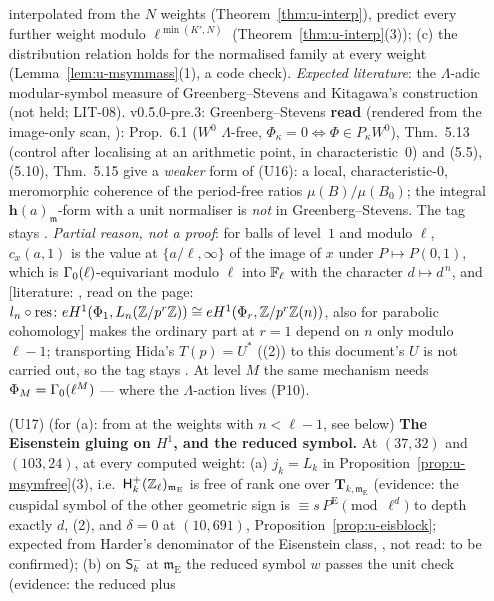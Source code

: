 \documentclass[11pt]{article}
\newcommand{\LIT}[1]{\textsf{[literature: #1]}}   %
\newcommand{\Iw}{\Lambda}                         %
\newcommand{\hcusp}{\mathbf{h}}                   %
\newcommand{\Tu}{\mathbf{T}}                      %
\newcommand{\Eis}{\mathrm{E}}
\newcommand{\Zl}{\Z_\ell}
\begin{document}
\begin{prediction}[(U15)--(U17): $\Iw$-adic modular symbols at the slot-21 cells]
\begin{enumerate}
  interpolated from the $N$ weights (Theorem~\ref{thm:u-interp}), predict every further weight modulo $\ell^{\min(K',N)}$ (Theorem~\ref{thm:u-interp}(3)); (c) the distribution relation holds for
  the normalised family at every weight (Lemma~\ref{lem:u-msymmass}(1), a code check). \emph{Expected literature}: the $\Iw$-adic modular-symbol measure of Greenberg--Stevens
  \cite{greenberg_stevens} and Kitagawa's construction (not held;  LIT-08). v0.5.0-pre.3: Greenberg--Stevens \textbf{read}
  (rendered from the image-only scan, ): Prop.~6.1 ($W^{0}$ $\Lambda$-free, $\Phi_\kappa=0\iff\Phi\in P_\kappa W^{0}$), Thm.~5.13 (control after
  localising at an arithmetic point, in characteristic~$0$) and (5.5), (5.10), Thm.~5.15 give a \emph{weaker} form of (U16): a local, characteristic-$0$, meromorphic coherence of the
  period-free ratios $\mu(B)/\mu(B_0)$; the integral $\hcusp(a)_{\mathfrak m}$-form with a unit normaliser is \emph{not} in Greenberg--Stevens. The tag stays \CONJ.
  \emph{Partial reason, not a proof}: for balls of level~$1$ and modulo $\ell$, $c_x(a,1)$ is the value at $\{a/\ell,\infty\}$ of the image of $x$ under $P\mapsto P(0,1)$, which is
  $\Ga_0(\ell)$-equivariant modulo $\ell$ into $\Fl$ with the character $d\mapsto d^{\,n}$, and \LIT{\cite[Cor.~4.5, p.~570]{hida_invent}, read on the page: $l_n\circ\mathrm{res}\colon
  eH^{1}(\Phi_1,L_n(\Z/p^{r}\Z))\cong eH^{1}(\Phi_r,\Z/p^{r}\Z(n))$, also for parabolic cohomology} makes the ordinary part at $r=1$ depend on $n$ only modulo $\ell-1$; transporting Hida's $T(p)=U^{\ast}$
  ((2)) to this document's $U$ is not carried out, so the tag stays \CONJ. At level $M$ the same mechanism needs $\Phi_M=\Ga_0(\ell^{M})$ --- where the
  $\Iw$-action lives (P10).
\item[(U17)] \CONJ{} (for (a): \PROVED{} from \STD{} at the weights with $n<\ell-1$, see below) \textbf{The Eisenstein gluing on $H^{1}$, and the reduced symbol.} At $(37,32)$ and $(103,24)$, at every computed weight: (a) $j_k=L_k$ in
  Proposition~\ref{prop:u-msymfree}(3), i.e.\ $\mathsf H^{+}_k(\Zl)_{\mathfrak m_\Eis}$ is free of rank one over $\Tu_{k,\mathfrak m_\Eis}$ (evidence: the cuspidal symbol of the other geometric sign is
  $\equiv s\,P^{\Eis}\pmod{\ell^{d}}$ to depth exactly $d$, (2), and $\delta=0$ at $(10,691)$, Proposition~\ref{prop:u-eisblock}; expected from Harder's denominator of the
  Eisenstein class, \cite{harder_eisenstein}, not read: to be confirmed); (b) on $\mathsf S^{-}_k$ at $\mathfrak m_\Eis$ the reduced symbol $w$ passes the unit check (evidence: the reduced plus

\end{enumerate}
\end{prediction}
\end{document}
